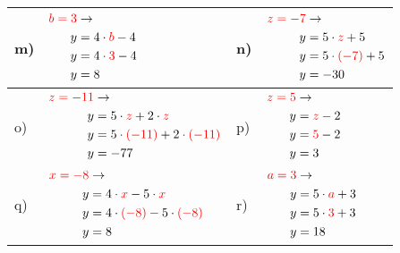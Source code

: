 \documentclass[12pt]{article}
\begin{document}
\begin{xltabular}{\textwidth}{|C{0.75cm}|X|C{0.75cm}|X|}
\\\hline
m)&$\begin{aligned}
\textcolor{red}{b=3} & \rightarrow\\
y&=4 \cdot \textcolor{red}{b} - 4\\
y&=4 \cdot \textcolor{red}{3} - 4\\
y&=8\\
\end{aligned}$
&
n)&$\begin{aligned}
\textcolor{red}{z=-7} & \rightarrow\\
y&=5 \cdot \textcolor{red}{z} + 5\\
y&=5 \cdot \textcolor{red}{(-7)} + 5\\
y&=-30\\
\end{aligned}$
\\\hline
o)&$\begin{aligned}
\textcolor{red}{z=-11} & \rightarrow\\
y&=5 \cdot \textcolor{red}{z} + 2 \cdot \textcolor{red}{z}\\
y&=5 \cdot \textcolor{red}{(-11)} + 2 \cdot \textcolor{red}{(-11)}\\
y&=-77\\
\end{aligned}$
&
p)&$\begin{aligned}
\textcolor{red}{z=5} & \rightarrow\\
y&=\textcolor{red}{z} - 2\\
y&=\textcolor{red}{5} - 2\\
y&=3\\
\end{aligned}$
\\\hline
q)&$\begin{aligned}
\textcolor{red}{x=-8} & \rightarrow\\
y&=4 \cdot \textcolor{red}{x} - 5 \cdot \textcolor{red}{x}\\
y&=4 \cdot \textcolor{red}{(-8)} - 5 \cdot \textcolor{red}{(-8)}\\
y&=8\\
\end{aligned}$
&
r)&$\begin{aligned}
\textcolor{red}{a=3} & \rightarrow\\
y&=5 \cdot \textcolor{red}{a} + 3\\
y&=5 \cdot \textcolor{red}{3} + 3\\
y&=18\\
\end{aligned}$
\\\hline
\end{xltabular}
\vspace{0.5cm}
\end{document}
